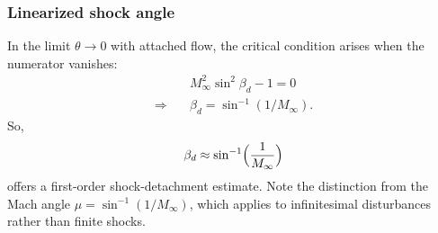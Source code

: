 \subsubsection{Linearized shock angle}
In the limit \(\theta\to0\) with attached flow, the critical condition arises when the numerator vanishes:
\begin{align*}
	&M_\infty^2\sin^2\beta_d - 1 = 0\\
	\Longrightarrow \quad &\beta_d = \sin^{-1}(1/M_\infty).
\end{align*}
So,
\begin{equation}
\beta_d \approx \sin^{-1}\Bigl(\frac{1}{M_\infty}\Bigr)
\label{eq:beta_d}
\end{equation}
offers a first-order shock-detachment estimate.  Note the distinction from the Mach angle \(\mu=\sin^{-1}(1/M_\infty)\), which applies to infinitesimal disturbances rather than finite shocks.


